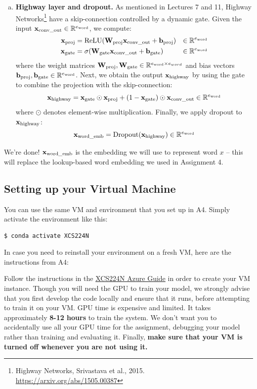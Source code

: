 \begin{enumerate}[(a)]
    \item \textbf{Highway layer and dropout.}
    As mentioned in Lectures 7 and 11, Highway Networks\footnote{Highway Networks, Srivastava et al., 2015. \url{https://arxiv.org/abs/1505.00387}} have a skip-connection controlled by a dynamic gate. Given the input $\mathbf{x}_\text{conv\_out} \in \mathbb{R}^{e_\text{word}}$, we compute:
    \begin{align}
        \mathbf{x}_{\text{proj}} &= \operatorname{ReLU}(\mathbf{W}_{\text{proj}} \mathbf{x}_\text{conv\_out} + \mathbf{b}_{\text{proj}}) &\in \mathbb{R}^{e_\text{word}} \\
        \mathbf{x}_{\text{gate}} &= \sigma(\mathbf{W}_\text{gate} \mathbf{x}_\text{conv\_out} + \mathbf{b}_\text{gate}) &\in \mathbb{R}^{e_\text{word}}
    \end{align}
    where the weight matrices $\mathbf{W}_\text{proj}, \mathbf{W}_\text{gate} \in \mathbb{R}^{e_\text{word} \times e_{word}}$ and bias vectors $\mathbf{b}_\text{proj}, \mathbf{b}_\text{gate} \in \mathbb{R}^{e_\text{word}}$. 
    Next, we obtain the output $\mathbf{x}_\text{highway}$ by using the gate to combine the projection with the skip-connection:
    \begin{equation}
    \mathbf{x}_\text{highway} = \mathbf{x}_\text{gate} \odot \mathbf{x}_\text{proj} + (1-\mathbf{x}_\text{gate}) \odot \mathbf{x}_\text{conv\_out} \in \mathbb{R}^{e_\text{word}}
    \end{equation}
    where $\odot$ denotes element-wise multiplication.
    Finally, we apply dropout to $\mathbf{x}_\text{highway}$:
    \begin{equation}
        \mathbf{x}_\text{word\_emb} = \text{Dropout}(\mathbf{x}_\text{highway}) \in \mathbb{R}^{e_\text{word}}
    \end{equation}
\end{enumerate}
We're done! $\mathbf{x}_\text{word\_emb}$ is the embedding we will use to represent word $x$ -- this will replace the lookup-based word embedding we used in Assignment 4.
\newpage

\subsection*{{\color{red} Setting up your Virtual Machine}}
You can use the same VM and environment that you set up in A4.  Simply activate the environment like this:
\begin{lstlisting}
$ conda activate XCS224N
\end{lstlisting}
In case you need to reinstall your environment on a fresh VM, here are the instructions from A4:

Follow the instructions in the \href{https://docs.google.com/document/d/1oy4FLADpCQDYYnO37ryntPV42foOgwtycbP5PMC8a8w}{XCS224N Azure Guide} in order to create your VM instance. Though you will need the GPU to train your model, we strongly advise that you first develop the code locally and ensure that it runs, before attempting to train it on your VM. GPU time is expensive and limited. It takes approximately \textbf{8-12 hours} to train the system. We don't want you to accidentally use all your GPU time for the assignment, debugging your model rather than training and evaluating it. Finally, \textbf{make sure that your VM is turned off whenever you are not using it.}

